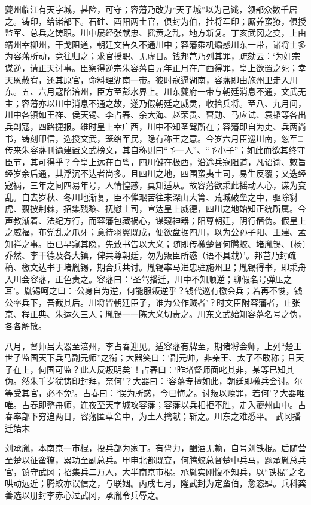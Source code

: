 \documentclass[]{article}
\begin{document}
夔州临江有天字城，甚险，可守；容藩乃改为``天子城''以为己谶，领部众数千居之。铸印，给诸部下。石砫、酉阳两土官，俱封为伯，挂将军印；厮养蛮獠，俱授监军、总兵之铸职。川中屡经张献忠、摇黄之乱，地方新复。丁亥武冈之变，上由靖州幸柳州，干戈阻道，朝廷文告久不通川中；容藩乘机煽惑川东一带，诸将士多为容藩所动，竞往归之；求官授职、无虚日。钱邦芑乃列其罪，疏劾云：`为奸宗谋逆，请正天讨事。臣察得逆宗朱容藩自元年正月在广西得罪，皇上欲置之死；幸天恩赦宥，还其原官，命料理湖南一带。彼时寇逼湖南，容藩即由施州卫走入川东。五、六月寇陷涪州，臣方至彭水界上。川东夔府一带与朝廷消息不通，文武无主；容藩亦以川中消息不通之故，遂乃假朝廷之威灵，收拾兵将。至八、九月间，川中各镇如王祥、侯天锡、李占春、余大海、赵荣贵、曹勋、马应试、袁韬等各出兵剿寇，四路捷报。维时皇上幸广西，川中不知圣驾所在；容藩即自为吏、兵两尚书，铸刻印信，选授文武，笼络军民，隐有称王之意。今岁六月臣巡川南，忽军□传来朱容藩刊谕建置文武榜文，其自称则曰``予一人''、``予小子''；如此而欲其终守臣节，其可得乎？今皇上远在百粤，四川僻在极西，沿途兵寇阻道，凡诏谕、敕旨经岁余后通，其浮沉不达者尚多。且四川之地，四围蛮夷土司，易生反覆；又迭经寇祸，三年之间四易年号，人情惶惑，莫知适从。故容藩欲乘此摇动人心，谋为变乱。自去岁秋、冬川地渐复，臣不惮艰苦往来深山大箐、荒城破垒之中，驱除豺虎、翦披荆棘，招集残黎、抚慰土司，宣达皇上威德，四川之地始知正统所属。今声教渐着、法纪方行，而容藩包藏祸心，谋窥神器；阳尊朝廷，阴行僭伪。假皇上之威福，布党乱之爪牙；意待羽翼既成，便欲盘据四川，以为公孙子阳、王建、孟知祥之事。臣已早窥其隐，先致书告以大义；随即传檄楚督何腾蛟、堵胤锡、〔杨〕乔然、李干德及各大镇，俾共尊朝廷，勿为叛臣所惑（语不具载）'。邦芑乃封疏稿、檄文达书于堵胤锡，期合兵共讨。胤锡率马进忠驻施州卫；胤锡得书，即乘舟入川会容藩，正色责之。容藩曰：`圣驾播迁，川中不知顺逆；聊假名号弹压之耳'。胤锡呵之曰：`公身自为逆，何能服叛逆乎？钱代巡有檄会兵；若再不悛，钱公率兵下，吾截其后。川将皆朝廷臣子，谁为公作贼者'？时文臣附容藩者，止张京、程正典、朱运久三人；胤锡一一陈大义切责之。川东文武始知容藩名号之伪，各各解散。

八月，督师吕大器至涪州，李占春迎见。适容藩有牌至，期诸将会师，上列``楚王世子监国天下兵马副元师''之衔；大器笑曰：`副元帅，非亲王、太子不敢称；且天子在上，何国可监？此人反叛明矣'！占春曰：`昨堵督师面叱其非，某等已知其伪。然朱千岁犹铸印封拜，奈何'？大器曰：`容藩专擅如此，朝廷即檄兵会讨。尔等受其官，必不免'。占春曰：`误为所惑，今已悔之。讨叛以赎罪，若何'？大器唯唯。占春即整舟师，连夜至天字城攻容藩；容藩以兵相拒不胜，走入夔州山中。占春率部下穷追两日，容藩匿草舍中，为土人擒献；斩之。川东之难悉平。
武冈播迁始末

刘承胤，本南京一市棍，投兵部为家丁。有膂力，酗酒无赖，自号刘铁棍。后随营至楚以征蛮獠，累功至副总兵。甲申北都既变，何腾蛟总督楚中兵马，题承胤总兵官，镇守武冈；招集兵二万人，大半南京市棍。承胤实刚愎不知兵，以``铁棍''之名哄动远近；腾蛟亦误信之，与联姻。丙戌七月，隆武封为定蛮伯，愈恣肆。兵科龚善选以册封李赤心过武冈，承胤令兵辱之。
\end{document}
